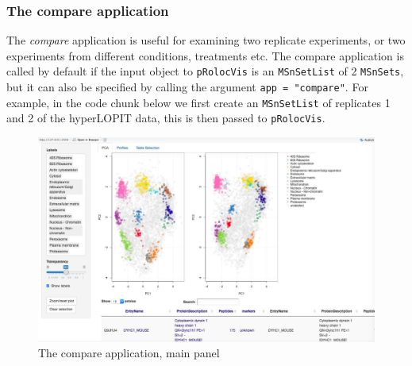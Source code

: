 \subsubsection*{The compare application}
The \textit{compare} application is useful for examining two replicate
experiments, or two experiments from different conditions, treatments
etc. The compare application is called by default if the input object
to \texttt{pRolocVis} is an \texttt{MSnSetList} of 2 \texttt{MSnSets},
but it can also be specified by calling the argument \texttt{app =
  "compare"}. For example, in the code chunk below we first create an
\texttt{MSnSetList} of replicates 1 and 2 of the hyperLOPIT data, this
is then passed to \texttt{pRolocVis}.

\begin{knitrout}
\color{fgcolor}\begin{kframe}
\begin{alltt}
 \hlkwb{<-} \hlstd{(}
  \hlstd{=} \hlstd{)}
\end{alltt}
\end{kframe}
\end{knitrout}

\begin{figure}[!ht]
  \centering
  \includegraphics[width=\textwidth]{./Figures/SS_Compare1.jpg}
  \caption{The compare application, main panel}
  \label{fig:compare}
\end{figure}

